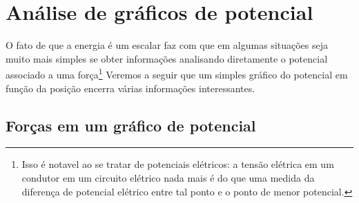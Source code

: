 \section{Análise de gráficos de potencial}

O fato de que a energia é um escalar faz com que em algumas situações seja muito mais simples se obter informações analisando diretamente o potencial associado a uma força\footnote[][-5cm]{Isso é notavel ao se tratar de potenciais elétricos: a tensão elétrica em um condutor em um circuito elétrico nada mais é do que uma medida da diferença de potencial elétrico entre tal ponto e o ponto de menor potencial.} Veremos a seguir que um simples gráfico do potencial em função da posição encerra várias informações interessantes.

\subsection{Forças em um gráfico de potencial}

